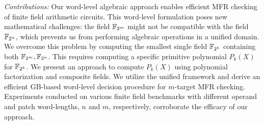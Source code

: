 
{\it Contributions:}
Our word-level algebraic approach enables efficient MFR checking 
of finite field arithmetic circuits.
This word-level formulation poses new mathematical challenges: 
the field ${\mathbb{F}}_{2^m}$ might not be compatible with the field
${\mathbb{F}}_{2^n}$, which prevents us from performing algebraic operations in a unified domain.
We overcome this problem by computing the smallest single field ${\mathbb{F}}_{2^k}$
containing both ${\mathbb{F}}_{2^m}, {\mathbb{F}}_{2^n}$. This requires computing 
a specific primitive polynomial $P_k(X)$ for ${\mathbb{F}}_{2^k}$. 
We present an approach to compute
$P_k(X)$ using polynomial factorization and composite
fields. We utilize the unified framework and derive an efficient
GB-based word-level decision procedure for $m$-target MFR checking.  
Experiments conducted on various finite field
benchmarks with different operand and patch word-lengths, $n$ and $m$,
respectively, corroborate the efficacy of our approach.



